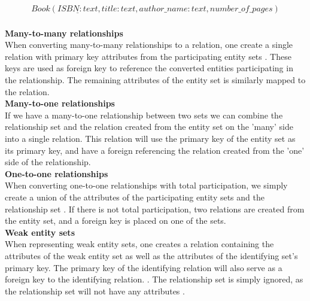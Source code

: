 \begin{equation}\label{eq:bookConversion}
    \begin{split}
        Book(\underline{ISBN : text} , title : text , author\_name : text , number\_of\_pages)
    \end{split}
\end{equation}
\\
\textbf{Many-to-many relationships}\\
When converting many-to-many relationships to a relation, one create a single relation with primary key attributes from the participating entity sets \cite{DBSBook}. These keys are used as foreign key to reference the converted entities participating in the relationship. 
The remaining attributes of the entity set is similarly mapped to the relation.\\
\textbf{Many-to-one relationships}\\
If we have a many-to-one relationship between two sets we can combine the relationship set and the relation created from the entity set on the 'many' side into a single relation. This relation will use the primary key of the entity set as its primary key, and have a foreign referencing the relation created from the 'one' side of the relationship.\\
\textbf{One-to-one relationships}\\
When converting one-to-one relationships with total participation, we simply create a union of the attributes of the participating entity sets and the relationship set \cite{DBSBook}. If there is not total participation, two relations are created from the entity set, and a foreign key is placed on one of the sets.\\
\textbf{Weak entity sets}\\
When representing weak entity sets, one creates a relation containing the attributes of the weak entity set as well as the attributes of the identifying set's primary key.
The primary key of the identifying relation will also serve as a foreign key to the identifying relation. \cite{DBSBook}.
The relationship set is simply ignored, as the relationship set will not have any attributes \cite{DBSBook}. 